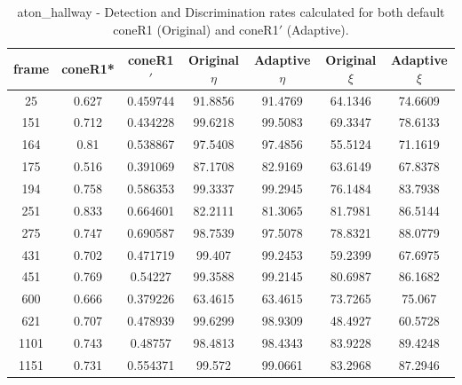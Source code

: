 \begin{appendices}
\begin{table}
\centering
\caption{aton\_hallway - Detection and Discrimination rates calculated for both default coneR1 (Original) and coneR1$'$ (Adaptive).}
\begin{tabular}{ |c|c|c|c|c|c|c| }
\hline
\textbf{frame} &  \textbf{coneR1*} &  \textbf{coneR1$'$} &  \textbf{Original $\eta$} &  \textbf{Adaptive $\eta$} &  \textbf{Original $\xi$} &  \textbf{Adaptive $\xi$} \\
\hline
\hline
25 &  0.627 &  0.459744 &  91.8856 &  91.4769 &  64.1346 &  74.6609 \\
\hline
151 &  0.712 &  0.434228 &  99.6218 &  99.5083 &  69.3347 &  78.6133 \\
\hline
164 &  0.81 &  0.538867 &  97.5408 &  97.4856 &  55.5124 &  71.1619 \\
\hline
175 &  0.516 &  0.391069 &  87.1708 &  82.9169 &  63.6149 &  67.8378 \\
\hline
194 &  0.758 &  0.586353 &  99.3337 &  99.2945 &  76.1484 &  83.7938 \\
\hline
251 &  0.833 &  0.664601 &  82.2111 &  81.3065 &  81.7981 &  86.5144 \\
\hline
275 &  0.747 &  0.690587 &  98.7539 &  97.5078 &  78.8321 &  88.0779 \\
\hline
431 &  0.702 &  0.471719 &  99.407 &  99.2453 &  59.2399 &  67.6975 \\
\hline
451 &  0.769 &  0.54227 &  99.3588 &  99.2145 &  80.6987 &  86.1682 \\
\hline
600 &  0.666 &  0.379226 &  63.4615 &  63.4615 &  73.7265 &  75.067 \\
\hline
621 &  0.707 &  0.478939 &  99.6299 &  98.9309 &  48.4927 &  60.5728 \\
\hline
1101 &  0.743 &  0.48757 &  98.4813 &  98.4343 &  83.9228 &  89.4248 \\
\hline
1151 &  0.731 &  0.554371 &  99.572 &  99.0661 &  83.2968 &  87.2946 \\
\hline
\end{tabular}

\end{table}


\end{appendices}
